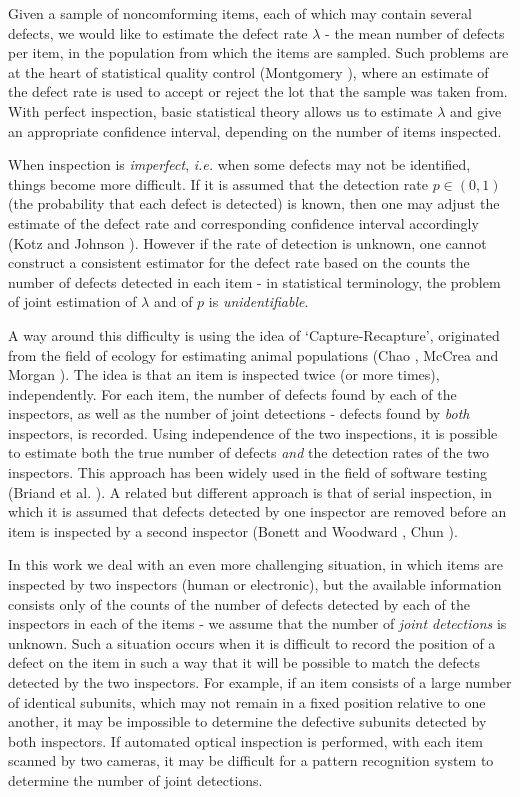 \documentclass[a4paper,10pt,twoside]{article}
\begin{document}
Given a sample of noncomforming items, each of which may contain several defects, we would like to estimate the defect rate $\lambda$ -
the mean number of defects per item, in the population from which the items are sampled. 
Such problems are at the heart of statistical quality control (Montgomery \cite{montgomery}), where an estimate of the defect rate 
is used to accept or reject the lot that the sample was taken from. With perfect inspection, 
basic statistical theory allows us to estimate $\lambda$ and give an appropriate confidence interval, depending on the
number of items inspected.

When inspection is {\it{imperfect}}, {\it{i.e.}} when some defects may not be identified, things become more difficult.
If it is assumed that the detection rate $p\in (0,1)$ (the probability that each defect is detected) is known, then one may adjust the estimate of
the defect rate and corresponding confidence interval accordingly (Kotz and Johnson \cite{kotz}). However if the rate of detection is unknown, one cannot construct a consistent estimator for the defect rate based
on the counts the number of defects detected in each item - in statistical terminology, the problem of
joint estimation of $\lambda$ and of $p$ is {\it{unidentifiable}}. 

A way around this difficulty is using the idea of `Capture-Recapture', originated from the field of ecology for estimating animal
populations (Chao \cite{chao2}, McCrea and Morgan \cite{mcrea}). The idea is that an item is inspected twice (or more times), independently. 
For each item, the number of defects found by each of the inspectors, as well as the number of joint detections - defects found by {\it{both}} 
inspectors, is recorded. Using independence of the two inspections, it is possible to estimate both the true number of defects {\it{and}} the detection rates 
of the two inspectors.  This approach has been widely used in the field of software testing (Briand et al. \cite{briand}). A related but different
approach is that of serial inspection, in which it is assumed that defects detected by one inspector are removed 
before an item is inspected by a second inspector (Bonett and Woodward \cite{bonnet1}, Chun \cite{chun}).

In this work we deal with an even more challenging situation, in which items are inspected by two inspectors (human or electronic), but the
available information consists only of the counts of the number of defects detected by each of the inspectors in each of the items -
we assume that the number of {\it{joint detections}}  is unknown. 
Such a situation occurs when it is difficult to record the position of a defect on the item in such a way that
it will be possible to match the defects detected by the two inspectors. For example, if an item consists of 
a large number of identical subunits, which may not remain in a fixed position relative to one another, it may be impossible to determine the defective subunits detected by both inspectors.
If automated optical inspection is performed, with each item scanned by two cameras, it may be difficult
for a pattern recognition system to determine the number of joint detections.
\end{document}
